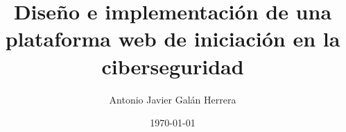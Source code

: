 \title[Plataforma web de iniciación en la ciberseguridad]
{Diseño e implementación de una plataforma web de iniciación en la ciberseguridad}

\author{Antonio Javier Galán Herrera}


\date{\today}
